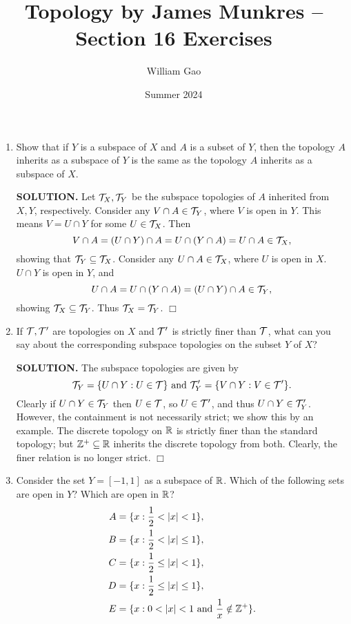 \documentclass{article}
\title{Topology by James Munkres -- Section 16 Exercises}
\author{William Gao}
\date{Summer 2024}
\begin{document}
\maketitle
\begin{enumerate}
    \item Show that if $Y$ is a subspace of $X$ and $A$ is a subset of $Y$, then the topology $A$ inherits as a subspace of $Y$ is the same as the topology $A$ inherits as a subspace of $X$.

    {\bf SOLUTION.} Let $\mathcal{T}_X, \mathcal{T}_Y$ be the subspace topologies of $A$ inherited from $X, Y$, respectively. Consider any $V \cap A \in \mathcal{T}_Y$, where $V$ is open in $Y$. This means $V = U \cap Y$ for some $U \in \mathcal{T}_X$. Then
    $$V \cap A = (U \cap Y) \cap A = U \cap (Y \cap A) = U \cap A \in \mathcal{T}_X,$$
    showing that $\mathcal{T}_Y \subseteq \mathcal{T}_X$. Consider any $U \cap A \in \mathcal{T}_X$, where $U$ is open in $X$. $U \cap Y$ is open in $Y$, and
    $$U \cap A = U \cap (Y \cap A) = (U \cap Y) \cap A \in \mathcal{T}_Y,$$
    showing $\mathcal{T}_X \subseteq \mathcal{T}_Y$. Thus $\mathcal{T}_X = \mathcal{T}_Y$. $\Box$

    \item If $\mathcal{T}, \mathcal{T}'$ are topologies on $X$ and $\mathcal{T}'$ is strictly finer than $\mathcal{T}$, what can you say about the corresponding subspace topologies on the subset $Y$ of $X$?

    {\bf SOLUTION.} The subspace topologies are given by
    $$\mathcal{T}_Y = \{U \cap Y: U \in \mathcal{T}\} \text{ and } \mathcal{T}'_Y = \{V \cap Y: V \in \mathcal{T}'\}.$$
    Clearly if $U \cap Y \in \mathcal{T}_Y$ then $U \in \mathcal{T}$, so $U \in \mathcal{T}'$, and thus $U \cap Y \in \mathcal{T}'_Y$. However, the containment is not necessarily strict; we show this by an example. The discrete topology on $\mathbb{R}$ is strictly finer than the standard topology; but $\mathbb{Z}^+ \subseteq \mathbb{R}$ inherits the discrete topology from both. Clearly, the finer relation is no longer strict. $\Box$

    \item Consider the set $Y = [-1, 1]$ as a subspace of $\mathbb{R}$. Which of the following sets are open in $Y$? Which are open in $\mathbb{R}$?
    \begin{align*}
        A &= \{x: \frac12 < |x| < 1\}, \\
        B &= \{x: \frac12 < |x| \leq 1\}, \\
        C &= \{x: \frac12 \leq |x| < 1\}, \\
        D &= \{x: \frac12 \leq |x| \leq 1\}, \\
        E &= \{x: 0 < |x| < 1 \text{ and } \frac1x \notin \mathbb{Z}^+ \}.
    \end{align*}


\end{enumerate}
\end{document}
